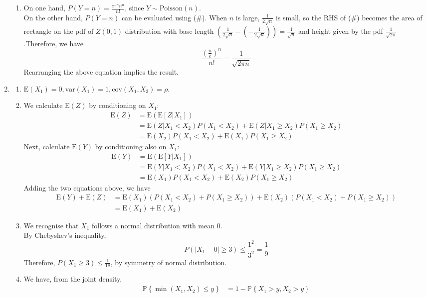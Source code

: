 \documentclass[12pt]{article}
\newcommand{\expec}{\mathrm{E}}
\newcommand{\var}{\mathrm{var}}
\newcommand{\cov}{\mathrm{cov}}
\newcommand{\Poi}{\mathrm{Poisson}}
\theoremstyle{definition}
\begin{document}
\begin{enumerate}
\begin{enumerate}
\item On one hand, $P(Y=n)=\frac{e^{-n}n^n}{n!}$, since $Y\sim\Poi(n)$. \\On the other hand, $P(Y=n)$ can be evaluated using (\#). When $n$ is large, $\frac{1}{2\sqrt{n}}$ is small, so the RHS of (\#) becomes the area of rectangle on the pdf of $Z(0,1)$ distribution with base length $(\frac{1}{2\sqrt{n}}-(-\frac{1}{2\sqrt{n}}))=\frac{1}{\sqrt{n}}$ and height given by the pdf $\frac{1}{\sqrt{2\pi}}$.Therefore, we have
\[
\frac{\left(\frac{n}{e}\right)^n}{n!}=\frac{1}{\sqrt{2\pi n}}
\]
Rearranging the above equation implies the result. 
\end{enumerate}
\item\begin{enumerate}
\item $\expec(X_1)=0, \var(X_1)=1, \cov(X_1,X_2)=\rho$.
\item We calculate $\expec(Z)$ by conditioning on $X_1$:
\begin{align*}
\expec(Z)&=\expec(\expec[Z|X_1])\\
&=\expec(Z|X_1<X_2)P(X_1<X_2)+\expec(Z|X_1\geq X_2)P(X_1\geq X_2)\\
&=\expec(X_2)P(X_1<X_2)+\expec(X_1)P(X_1\geq X_2)
\end{align*}
Next, calculate $\expec(Y)$ by conditioning also on $X_1$:
\begin{align*}
\expec(Y)&=\expec(\expec[Y|X_1])\\
&=\expec(Y|X_1<X_2)P(X_1<X_2)+\expec(Y|X_1\geq X_2)P(X_1\geq X_2)\\
&=\expec(X_1)P(X_1<X_2)+\expec(X_2)P(X_1\geq X_2)
\end{align*}
Adding the two equations above, we have
\begin{align*}
\expec(Y)+\expec(Z)&=\expec(X_1)(P(X_1<X_2)+P(X_1\geq X_2))+\expec(X_2)(P(X_1<X_2)+P(X_1\geq X_2))\\&=\expec(X_1)+\expec(X_2)
\end{align*}
\item We recognise that $X_1$ follows a normal distribution with mean 0.\\ By Chebyshev's inequality,
\[
P(|X_1-0|\geq 3)\leq \frac{1^2}{3^2}=\frac{1}{9}
\]
Therefore, $P(X_1\geq 3)\leq \frac{1}{18}$, by symmetry of normal distribution.
\item We have, from the joint density,
\begin{align*}
\mathbb{P}\left\{\min(X_1,X_2) \leq y\right\} &= 1 - \mathbb{P}\left\{ X_1 > y, X_2 > y \right\} \\

\end{align*}
\end{enumerate}
\end{enumerate}
\end{document}
